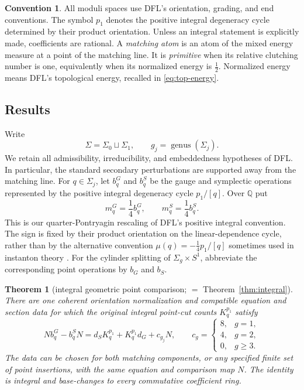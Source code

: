 \documentclass[11pt]{amsart}
\theoremstyle{definition}
\newtheorem{convention}[theorem]{Convention}
\theoremstyle{remark}
\theoremstyle{plain}
\newtheorem{letterresult}{Theorem}
\newcommand{\QQ}{\mathbb{Q}}
\begin{document}
\begin{convention}\label{conv:global}
All moduli spaces use DFL's orientation, grading, and end conventions.
The symbol $p_1$ denotes the positive integral degeneracy cycle determined
by their product orientation.  Unless an integral statement is explicitly
made, coefficients are rational.  A \emph{matching atom} is an atom of the
mixed energy measure at a point of the matching line.  It is
\emph{primitive} when its relative clutching number is one, equivalently
when its normalized energy is $\frac12$.  Normalized energy means DFL's
topological energy, recalled in \eqref{eq:top-energy}.
\end{convention}

\subsection{Results}
Write
\[
                       \Sigma=\Sigma_0\sqcup\Sigma_1,
       \qquad g_j=\operatorname{genus}(\Sigma_j).
\]
We retain all admissibility, irreducibility, and embeddedness hypotheses
of DFL.  In particular, the standard secondary perturbations are supported
away from the matching line.  For $q\in\Sigma_j$, let $b_q^G$ and $b_q^S$
be the gauge and symplectic operations represented by the positive
integral degeneracy cycle $p_1/[q]$.  Over $\QQ$ put
\[
                      m_q^G=\frac14b_q^G,
              \qquad m_q^S=\frac14b_q^S.
\]
This is our quarter-Pontryagin rescaling of DFL's positive
integral convention. The sign is fixed by their product
orientation on the linear-dependence cycle, rather than
by the alternative convention $\mu(q)=-\frac14p_1/[q]$ sometimes used in
instanton theory \cite{DonaldsonKronheimer90}.
For the cylinder splitting of $\Sigma_g\times S^1$, abbreviate the
corresponding point operations by $b_G$ and $b_S$.

\begin{letterresult}[integral geometric point comparison;
  $=$ Theorem~\ref{thm:integral}]
\label{thm:intro-main}
There are one coherent orientation normalization and
compatible equation and section data for which the
original integral point-cut counts $K_q^{p_1}$ satisfy
\begin{equation}\label{eq:intro-main}
 N b_q^G-b_q^S N
 =d_SK_q^{p_1}+K_q^{p_1}d_G+c_{g_j}N,\qquad
 c_g=
 \begin{cases}
 8,&g=1,\\
 4,&g=2,\\
 0,&g\geq3.
 \end{cases}
\end{equation}
The data can be chosen for both matching components,
or any specified finite set of point insertions,
with the same equation and comparison map $N$.
The identity is integral and base-changes to every
commutative coefficient ring.
\end{letterresult}
\end{document}
